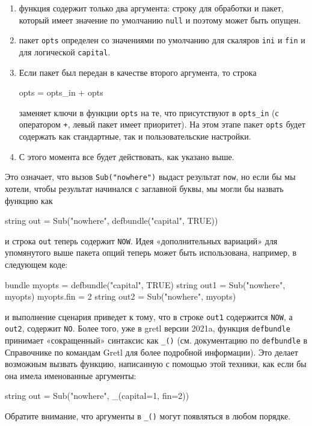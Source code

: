 \begin{enumerate}
\item функция содержит только два аргумента: строку для обработки и
  пакет, который имеет значение по умолчанию \texttt{null} и поэтому
  может быть опущен.
\item пакет \texttt{opts} определен со значениями по умолчанию для
  скаляров \texttt{ini} и \texttt{fin} и для логической
  \texttt{capital}.
\item Если пакет был передан в качестве второго аргумента, то строка
  \begin{code}
     opts = opts_in + opts
  \end{code}
  заменяет ключи в функции \texttt{opts} на те, что присутствуют в
  \texttt{opts\_in} (с оператором \texttt{+}, левый пакет имеет
  приоритет). На этом этапе пакет \texttt{opts} будет содержать как
  стандартные, так и пользовательские настройки.
 
\item С этого момента все будет действовать, как указано выше.
\end{enumerate}
Это означает, что вызов \texttt{Sub("nowhere")} выдаст результат
\texttt{now}, но если бы мы хотели, чтобы результат начинался с
заглавной буквы, мы могли бы назвать функцию как
\begin{code}
  string out = Sub("nowhere", defbundle("capital", TRUE))
\end{code}
и строка \texttt{out} теперь содержит \texttt{NOW}. Идея
«дополнительных вариаций» для упомянутого выше пакета опций теперь
может быть использована, например, в следующем коде:
\begin{code}
  bundle myopts = defbundle("capital", TRUE)
  string out1 = Sub("nowhere", myopts)
  myopts.fin = 2
  string out2 = Sub("nowhere", myopts)
\end{code}
и выполнение сценария приведет к тому, что в строке \texttt{out1}
содержится \texttt{NOW}, а \texttt{out2}, содержит \texttt{NO}.  Более
того, уже в gretl версии 2021a, функция \texttt{defbundle} принимает
«сокращенный» синтаксис как \verb|_()| (см. документацию по
\texttt{defbundle} в Справочнике по командам Gretl для более подробной
информации). Это делает возможным вызвать функцию, написанную с
помощью этой техники, как если бы она имела именованные аргументы:
\begin{code}
  string out = Sub("nowhere", _(capital=1, fin=2))
\end{code}
Обратите внимание, что аргументы в \verb|_()| могут появляться в любом
порядке.

